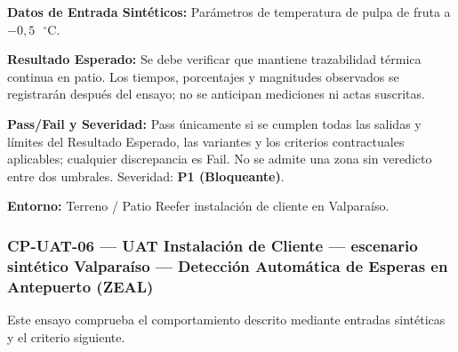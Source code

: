 \par\noindent\textbf{Datos de Entrada Sintéticos:} Parámetros de temperatura de pulpa de fruta a \(-0{,}5\text{ }^\circ\text{C}\).\par
\par\noindent\textbf{Resultado Esperado:} Se debe verificar que mantiene trazabilidad térmica continua en patio. Los tiempos, porcentajes y magnitudes observados se registrarán después del ensayo; no se anticipan mediciones ni actas suscritas.\par
\par\noindent\textbf{Pass/Fail y Severidad:} Pass únicamente si se cumplen todas las salidas y límites del Resultado Esperado, las variantes y los criterios contractuales aplicables; cualquier discrepancia es Fail. No se admite una zona sin veredicto entre dos umbrales. Severidad: \textbf{P1 (Bloqueante)}.\par
\par\noindent\textbf{Entorno:} Terreno / Patio Reefer instalación de cliente en Valparaíso.\par


\subsubsection*{CP-UAT-06 — UAT Instalación de Cliente — escenario sintético Valparaíso — Detección Automática de Esperas en Antepuerto (ZEAL)}\label{sec:9-cp-uat-06}
Este ensayo comprueba el comportamiento descrito mediante entradas sintéticas y el criterio siguiente.

